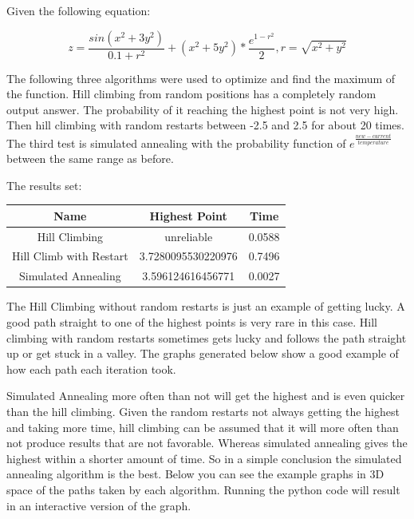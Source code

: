 \documentclass[letter,12pt]{article}
\begin{document}
\pagestyle{headings}

Given the following equation:

\begin{equation}
z = \frac{sin(x^2 + 3y^2)}{0.1+r^2}
+ (x^2 + 5y^2) * \frac{e^{1-r^2}}{2},
r = \sqrt{x^2+y^2}
\end{equation}

The following three algorithms were used to optimize and find the maximum of the function. Hill climbing from random positions has a completely random output answer. The probability of it reaching the highest point is not very high. Then hill climbing with random restarts between -2.5 and 2.5 for about 20 times. The third test is simulated annealing with the probability function of $ e^{\frac{new-current}{temperature}} $ between the same range as before.

The results set:

\begin{center}
 \begin{tabular}{c c c}
 \hline
 Name & Highest Point & Time  \\ [0.5ex]
 \hline\hline
 Hill Climbing & unreliable & 0.0588  \\
 \hline
 Hill Climb with Restart & 3.7280095530220976 & 0.7496 \\
 \hline
 Simulated Annealing & 3.596124616456771 & 0.0027 \\
 \hline
\end{tabular}
\end{center}

The Hill Climbing without random restarts is just an example of getting lucky. A good path straight to one of the highest points is very rare in this case. Hill climbing with random restarts sometimes gets lucky and follows the path straight up or get stuck in a valley. The graphs generated below show a good example of how each path each iteration took.

Simulated Annealing more often than not will get the highest and is even quicker than the hill climbing. Given the random restarts not always getting the highest and taking more time, hill climbing can be assumed that it will more often than not produce results that are not favorable. Whereas simulated annealing gives the highest within a shorter amount of time. So in a simple conclusion the simulated annealing algorithm is the best. Below you can see the example graphs in 3D space of the paths taken by each algorithm. Running the python code will result in an interactive version of the graph.
\end{document}
